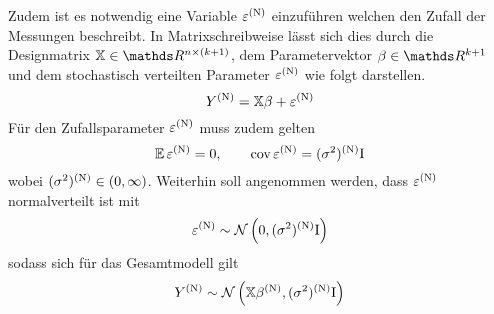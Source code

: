 		Zudem ist es notwendig eine Variable $\varepsilon^{\mathrm{(N)}}$ einzuführen welchen den Zufall der Messungen beschreibt.
	    In Matrixschreibweise lässt sich dies durch die Designmatrix $\mathbb{X} \in \SR^{n \times (k+1)}$, dem Parametervektor $\beta \in \SR^{k+1}$ und dem stochastisch  verteilten Parameter $\varepsilon^{\mathrm{(N)}}$ wie folgt darstellen.
		\[
			Y^{\mathrm{(N)}} = \mathbb{X}\beta + \varepsilon^{\mathrm{(N)}}
		\]
		Für den Zufallsparameter $\varepsilon^{\mathrm{(N)}}$ muss zudem gelten
		\[
			\operatorname{\mathbb{E}} \varepsilon^{\mathrm{(N)}} = 0, \qquad \operatorname{cov} \varepsilon^{\mathrm{(N)}} = (\sigma^2)^{\mathrm{(N)}} \mathrm{I}
		\]
		wobei $(\sigma^2)^{\mathrm{(N)}} \in (0,\infty)$.
		Weiterhin soll angenommen werden, dass $\varepsilon^{\mathrm{(N)}}$ normalverteilt ist mit
	    \[
			\varepsilon^{\mathrm{(N)}} \sim \mathcal{N} \left( 0,(\sigma^2)^{\mathrm{(N)}}\mathrm{I} \right)
		\]
	    sodass sich für das Gesamtmodell gilt
		\[
			Y^{\mathrm{(N)}} \sim \mathcal{N} \left( \mathbb{X}\beta^{\mathrm{(N)}},(\sigma^2)^{\mathrm{(N)}} \mathrm{I} \right)
		\]


